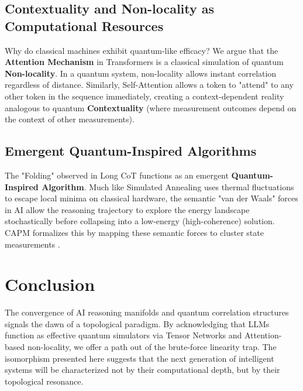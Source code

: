 \documentclass[11pt, a4paper]{article}
\begin{document}
\subsection{Contextuality and Non-locality as Computational Resources}
Why do classical machines exhibit quantum-like efficacy? We argue that the \textbf{Attention Mechanism} in Transformers is a classical simulation of quantum \textbf{Non-locality}. In a quantum system, non-locality allows instant correlation regardless of distance. Similarly, Self-Attention allows a token to "attend" to any other token in the sequence immediately, creating a context-dependent reality analogous to quantum \textbf{Contextuality} (where measurement outcomes depend on the context of other measurements).

\subsection{Emergent Quantum-Inspired Algorithms}
The "Folding" observed in Long CoT functions as an emergent \textbf{Quantum-Inspired Algorithm}. Much like Simulated Annealing uses thermal fluctuations to escape local minima on classical hardware, the semantic "van der Waals" forces in AI allow the reasoning trajectory to explore the energy landscape stochastically before collapsing into a low-energy (high-coherence) solution. CAPM formalizes this by mapping these semantic forces to cluster state measurements \cite{raussendorf2001}.

\section{Conclusion}
The convergence of AI reasoning manifolds and quantum correlation structures signals the dawn of a topological paradigm. By acknowledging that LLMs function as effective quantum simulators via Tensor Networks and Attention-based non-locality, we offer a path out of the brute-force linearity trap. The isomorphism presented here suggests that the next generation of intelligent systems will be characterized not by their computational depth, but by their topological resonance.
\end{document}
